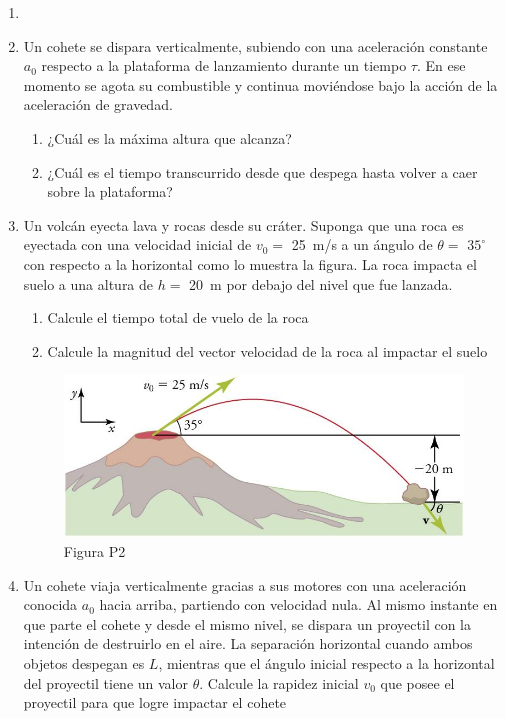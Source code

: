\documentclass[letterpaper,11pt]{article}
\begin{document}
\vspace{-1cm}
\begin{enumerate}\setlength{\itemsep}{0.4cm}


\item[]

\item Un cohete se dispara verticalmente, subiendo con una aceleración constante $a_0$ respecto a la plataforma de lanzamiento durante un tiempo $\tau$. En ese momento se agota su combustible y continua moviéndose bajo la acción de la aceleración de gravedad.
    \begin{enumerate}
        \item ¿Cuál es la máxima altura que alcanza?
        \item ¿Cuál es el tiempo transcurrido desde que despega hasta volver a caer sobre la plataforma?
    \end{enumerate}
    
\item Un volcán eyecta lava y rocas desde su cráter. Suponga que una roca es eyectada con una velocidad inicial de $v_0 = $ \SI{25}{\m/\s} a un ángulo de $\theta = $ $35^{\circ}$ con respecto a la horizontal como lo muestra la figura. La roca impacta el suelo a una altura de $h = $ \SI{20}{\m} por debajo del nivel que fue lanzada.
    \begin{enumerate}
        \item Calcule el tiempo total de vuelo de la roca
        
        \item Calcule la magnitud del vector velocidad de la roca al impactar el suelo
    \end{enumerate}

\begin{figure}[H]
    \centering
    \includegraphics[width=0.5\linewidth]{2021-1/Imagenes/aux2/volcan.jpg}
    \caption*{Figura P2}
\end{figure}

\item Un cohete viaja verticalmente gracias a sus motores con una aceleración conocida $a_0$ hacia arriba, partiendo con velocidad nula. Al mismo instante en que parte el cohete y desde el mismo nivel, se dispara un proyectil con la intención de destruirlo en el aire. La separación horizontal cuando ambos objetos despegan es $L$, mientras que el ángulo inicial respecto a la horizontal del proyectil tiene un valor $\theta$. Calcule la rapidez inicial $v_0$ que posee el proyectil para que logre impactar el cohete


\end{enumerate}
\end{document}
